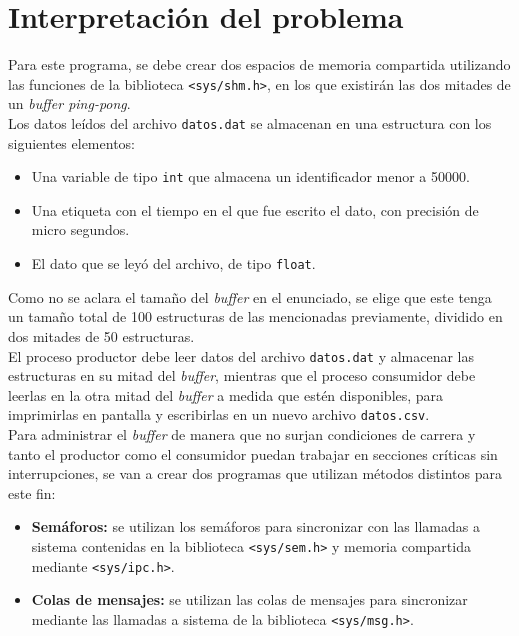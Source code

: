 \section{Interpretación del problema}
Para este programa, se debe crear dos espacios de memoria compartida utilizando las funciones de la biblioteca \texttt{<sys/shm.h>}, en los que existirán las dos mitades de un \textit{buffer ping-pong}.\\

Los datos leídos del archivo \texttt{datos.dat} se almacenan en una estructura con los siguientes elementos:

\begin{itemize}
    \item Una variable de tipo \texttt{int} que almacena un identificador menor a 50000.
    \item Una etiqueta con el tiempo en el que fue escrito el dato, con precisión de micro segundos.
    \item El dato que se leyó del archivo, de tipo \texttt{float}.\\
\end{itemize}

Como no se aclara el tamaño del \textit{buffer} en el enunciado, se elige que este tenga un tamaño total de 100 estructuras de las mencionadas previamente, dividido en dos mitades de 50 estructuras.\\

El proceso productor debe leer datos del archivo \texttt{datos.dat} y almacenar las estructuras en su mitad del \textit{buffer}, mientras que el proceso consumidor debe leerlas en la otra mitad del \textit{buffer} a medida que estén disponibles, para imprimirlas en pantalla y escribirlas en un nuevo archivo \texttt{datos.csv}.\\

Para administrar el \textit{buffer} de manera que no surjan condiciones de carrera y tanto el productor como el consumidor puedan trabajar en secciones críticas sin interrupciones, se van a crear dos programas que utilizan métodos distintos para este fin:\\

\begin{itemize}
    \item \textbf{Semáforos:} se utilizan los semáforos para sincronizar con las llamadas a sistema contenidas en la biblioteca \texttt{<sys/sem.h>} y memoria compartida mediante \texttt{<sys/ipc.h>}.
    \item \textbf{Colas de mensajes:} se utilizan las colas de mensajes para sincronizar mediante las llamadas a sistema de la biblioteca \texttt{<sys/msg.h>}.\\
\end{itemize}